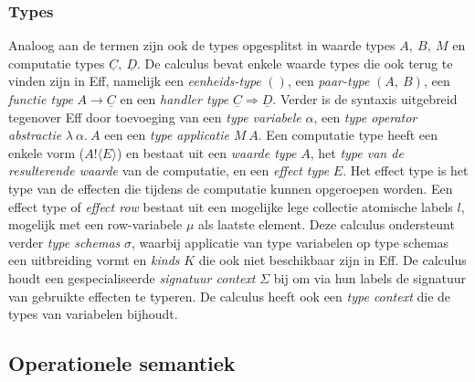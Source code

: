 \subsubsection{Types}
Analoog aan de termen zijn ook de types opgesplitst in waarde types $A,\:B,\:M$ en computatie types $\underline{C},\:\underline{D}$. \newline
De calculus bevat enkele waarde types die ook terug te vinden zijn in Eff, namelijk een \emph{eenheids-type} $()$, een \emph{paar-type} $(A,\:B)$, een \emph{functie type} $A \rightarrow \underline{C}$ en een \emph{handler type} $\underline{C} \Rightarrow \underline{D}$. Verder is de syntaxis uitgebreid tegenover Eff door toevoeging van een \emph{type variabele} $\alpha$, een \emph{type operator abstractie} $\lambda \: \alpha. \: A$ een een \emph{type applicatie} $M\:A$. \newline 
Een computatie type heeft een enkele vorm ($A!\langle E \rangle$) en bestaat uit een \emph{waarde type} $A$, het \emph{type van de resulterende waarde} van de computatie, en een \emph{effect type} $E$. Het effect type is het type van de effecten die tijdens de computatie kunnen opgeroepen worden. \newline 
Een effect type of \emph{effect row} bestaat uit een mogelijke lege collectie atomische labels $l$, mogelijk met een row-variabele $\mu$ als laatste element. \newline
Deze calculus ondersteunt verder \emph{type schemas} $\sigma$, waarbij applicatie van type variabelen op type schemas een uitbreiding vormt en \emph{kinds} $K$ die ook niet beschikbaar zijn in Eff. De calculus houdt een gespecialiseerde \emph{signatuur context} $\Sigma$ bij om via hun labels de signatuur van gebruikte effecten te typeren. De calculus heeft ook een \emph{type context} die de types van variabelen bijhoudt.

\subsection{Operationele semantiek}
\label{sec:OpSemScop}

